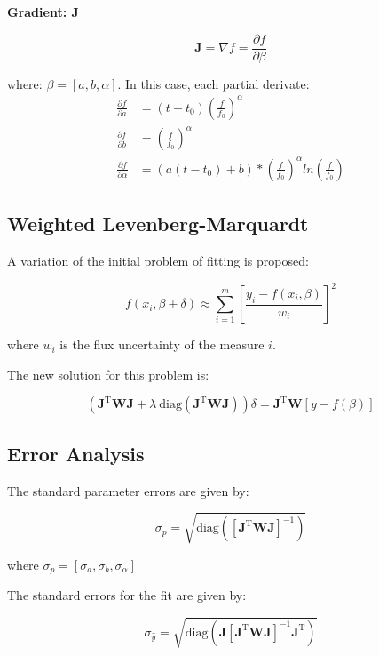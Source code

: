 \documentclass[10pt]{article}
\begin{document}
\noindent\textbf{Gradient: $\mathbf{J}$} 

$$ \mathbf{J} = \nabla f = \frac{\partial f}{\partial \beta} $$ 

where: $\beta = [a, b, \alpha]$. In this case, each partial derivate:
\begin{align*}
    \frac{\partial f}{\partial a}           &= (t - t_0)\left(\frac{f}{f_0}\right)^\alpha \\
    \frac{\partial f}{\partial b}           &= \left(\frac{f}{f_0}\right)^\alpha \\
    \frac{\partial f}{\partial \alpha}      &= (a(t-t_0)+b)*\left(\frac{f}{f_0}\right)^\alpha ln\left(\frac{f}{f_0}\right)
\end{align*}

\subsection{Weighted Levenberg-Marquardt}
A variation of the initial problem of fitting is proposed:

$$ f(x_i, \beta + \delta) \approx \sum\limits_{i=1}^m \left[\frac{y_i - f(x_i, \beta)}{w_i} \right]^2 $$

\noindent where $w_i$ is the flux uncertainty of the measure $i$.

\noindent The new solution for this problem is:

$$ (\mathbf{J}^{\text{T}}\mathbf{W}\mathbf{J} + \lambda~\text{diag}(\mathbf{J}^{\text{T}}\mathbf{W}\mathbf{J})) \delta = \mathbf{J}^{\text{T}}\mathbf{W}[y - f(\beta)] $$

\subsection{Error Analysis}

The standard parameter errors are given by:

$$ \sigma_p = \sqrt{\text{diag}([\mathbf{J}^{\text{T}}\mathbf{W}\mathbf{J}]^{-1})} $$

\noindent where $\sigma_p = [\sigma_a, \sigma_b, \sigma_{\alpha}] $


\noindent The standard errors for the fit are given by:

$$ \sigma_{\hat{y}} = \sqrt{\text{diag}(\mathbf{J}[\mathbf{J}^{\text{T}}\mathbf{W}\mathbf{J}]^{-1}\mathbf{J}^{\text{T}})} $$
\end{document}
